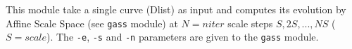 This module take a single curve (Dlist) as input and computes its evolution
by Affine Scale Space (see \verb+gass+ module) at $N=niter$ scale steps
$S,2S,...,NS$ ($S=scale$). The \verb+-e+, \verb+-s+ and \verb+-n+ parameters
are given to the \verb+gass+ module. 
